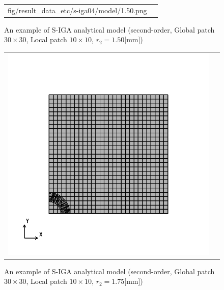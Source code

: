 \begin{figure}[hbtp]
\begin{tabular}{cc}
\begin{minipage}[t]{0.45\hsize}
      {fig/result_data_etc/s-iga04/model/1.50.png}
      \caption{An example of S-IGA analytical model (second-order, Global patch $30\times 30$, Local patch $10\times 10$, $r_2 = 1.50$[mm])}
      \label{fig:s-iga04 model 1.50}
    \end{minipage}
  \end{tabular}
\end{figure}

\begin{figure}[hbtp]
  \begin{tabular}{cc}
    \begin{minipage}[t]{0.45\hsize}
      \centering
      \includegraphics[keepaspectratio, scale=0.35]
      {fig/result_data_etc/s-iga04/model/1.75.png}
      \caption{An example of S-IGA analytical model (second-order, Global patch $30\times 30$, Local patch $10\times 10$, $r_2 = 1.75$[mm])}
      \label{fig:s-iga04 model 1.75}
    \end{minipage} &
    \begin{minipage}[t]{0.45\hsize}
      \centering

\end{minipage}
\end{tabular}
\end{figure}
